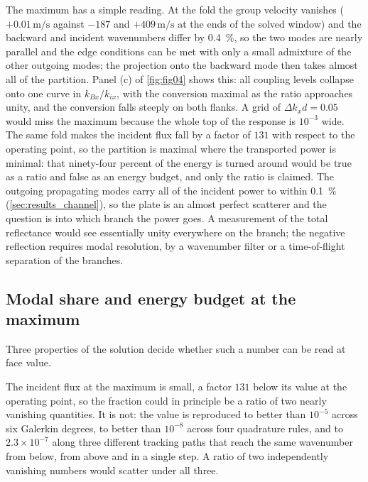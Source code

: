 The maximum has a simple reading.  At the fold the group velocity vanishes ($+0.01\,\si{\metre\per\second}$ against $-187$ and $+409\,\si{\metre\per\second}$ at the ends of the solved window) and the backward and incident wavenumbers differ by \SI{0.4}{\percent}, so the two modes are nearly parallel and the edge conditions can be met with only a small admixture of the other outgoing modes; the projection onto the backward mode then takes almost all of the partition.  Panel (c) of \cref{fig:fig04} shows this: all coupling levels collapse onto one curve in $k_{Bx}/k_{ix}$, with the conversion maximal as the ratio approaches unity, and the conversion falls steeply on both flanks.  A grid of $\Delta k_xd=0.05$ would miss the maximum because the whole top of the response is $10^{-3}$ wide.  The same fold makes the incident flux fall by a factor of $131$ with respect to the operating point, so the partition is maximal where the transported power is minimal: that ninety-four percent of the energy is turned around would be true as a ratio and false as an energy budget, and only the ratio is claimed.  The outgoing propagating modes carry all of the incident power to within \SI{0.1}{\percent} (\cref{sec:results_channel}), so the plate is an almost perfect scatterer and the question is into which branch the power goes.  A measurement of the total reflectance would see essentially unity everywhere on the branch; the negative reflection requires modal resolution, by a wavenumber filter or a time-of-flight separation of the branches.

\subsection{Modal share and energy budget at the maximum}
\label{sec:results_artefact}
\label{sec:results_channel}

Three properties of the solution decide whether such a number can be read at
face value.

The incident flux at the maximum is small, a
factor $131$ below its value at the operating point, so the fraction could in
principle be a ratio of two nearly vanishing quantities.  It is not: the value
is reproduced to better than $10^{-5}$ across six Galerkin degrees, to
better than $10^{-8}$ across four quadrature rules, and to $2.3\times10^{-7}$ along three
different tracking paths that reach the same wavenumber from below, from above
and in a single step.  A ratio of two independently vanishing numbers would
scatter under all three.


